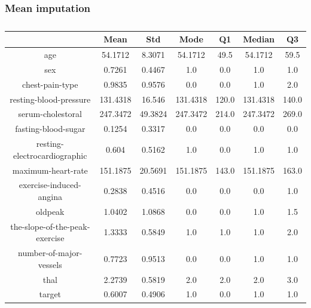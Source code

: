 \documentclass{classrep}
\begin{document}
{{{            }

            \subsubsection{Mean imputation}
            \label{results:15-percent:mean-input} {
                \begin{table}[!htbp]
                    \centering
                    \begin{tabular}{|c|c|c|c|c|c|c|}
                        \hline
                        & Mean & Std & Mode & Q1 & Median & Q3 \\ \hline
                        age & 54.1712 & 8.3071 & 54.1712 & 49.5 & 54.1712 & 59.5 \\ \hline
                        sex & 0.7261 & 0.4467 & 1.0 & 0.0 & 1.0 & 1.0 \\ \hline
                        chest-pain-type & 0.9835 & 0.9576 & 0.0 & 0.0 & 1.0 & 2.0 \\ \hline
                        resting-blood-pressure & 131.4318 & 16.546 & 131.4318 & 120.0 & 131.4318 & 140.0 \\ \hline
                        serum-cholestoral & 247.3472 & 49.3824 & 247.3472 & 214.0 & 247.3472 & 269.0 \\ \hline
                        fasting-blood-sugar & 0.1254 & 0.3317 & 0.0 & 0.0 & 0.0 & 0.0 \\ \hline
                        resting-electrocardiographic & 0.604 & 0.5162 & 1.0 & 0.0 & 1.0 & 1.0 \\ \hline
                        maximum-heart-rate & 151.1875 & 20.5691 & 151.1875 & 143.0 & 151.1875 & 163.0 \\ \hline
                        exercise-induced-angina & 0.2838 & 0.4516 & 0.0 & 0.0 & 0.0 & 1.0 \\ \hline
                        oldpeak & 1.0402 & 1.0868 & 0.0 & 0.0 & 1.0 & 1.5 \\ \hline
                        the-slope-of-the-peak-exercise & 1.3333 & 0.5849 & 1.0 & 1.0 & 1.0 & 2.0 \\ \hline
                        number-of-major-vessels & 0.7723 & 0.9513 & 0.0 & 0.0 & 1.0 & 1.0 \\ \hline
                        thal & 2.2739 & 0.5819 & 2.0 & 2.0 & 2.0 & 3.0 \\ \hline
                        target & 0.6007 & 0.4906 & 1.0 & 0.0 & 1.0 & 1.0 \\ \hline
                    \end{tabular}
                    \caption{}
                    \label{result_15_Mean-imputation}
                \end{table}
                \FloatBarrier

}}}
\end{document}
